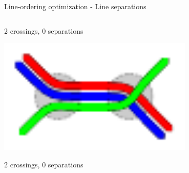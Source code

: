 \documentclass{beamer}
\begin{document}
\begin{frame}{Line-ordering optimization - Line separations}
\begin{columns}[T]
\begin{column}[T]{0.45\textwidth}
			2 crossings, \textcolor{black!40!green}{0 separations}

			\vspace{1.5cm}

			\centering \includegraphics[width=0.7\textwidth]{figures/splitting_example2.pdf}

			2 crossings, \textcolor{black!40!green}{0 separations}
		\end{column}
	\end{columns}
\end{frame}
\end{document}
